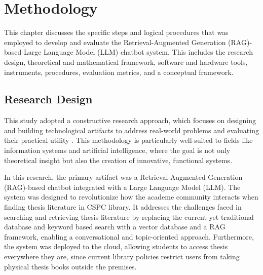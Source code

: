 \chapter{Methodology}
\begin{refsection}
 
This chapter discusses the specific steps and logical procedures that was employed to develop and evaluate the Retrieval-Augmented Generation (RAG)-based Large Language Model (LLM) chatbot system. This includes the research design, theoretical and mathematical framework, software and hardware tools, instruments, procedures, evaluation metrics, and a conceptual framework.

\section{Research Design}

This study adopted a constructive research approach, which focuses on designing and building technological artifacts to address real-world problems and evaluating their practical utility \citeauthor{lukka2003cons} \citeyear{lukka2003cons}. This methodology is particularly well-suited to fields like information systems and artificial intelligence, where the goal is not only theoretical insight but also the creation of innovative, functional systems.

In this research, the primary artifact was a Retrieval-Augmented Generation (RAG)-based chatbot integrated with a Large Language Model (LLM). The system was designed to revolutionize how the academe community interacts when finding thesis literature in CSPC library. It addresses the challenges faced in searching and retrieving thesis literature by replacing the current yet traditional database and keyword based search with a vector database and a RAG framework, enabling a conversational and topic-oriented approach. Furthermore, the system was deployed to the cloud, allowing students to access thesis everywhere they are, since current library policies restrict users from taking physical thesis books outside the premises.




\end{refsection}
